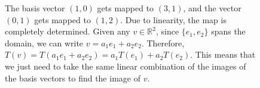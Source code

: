 \begin{example}
\begin{figure}[H]
			\caption{The basis vector $(1, 0)$ gets mapped to $(3, 1)$, and the vector $(0, 1)$ gets mapped to $(1, 2)$. Due to linearity, the map is completely determined. Given any $v \in \mathbb{R}^2$, since $\{e_1, e_2\}$ spans the domain, we can write $v = a_1 e_1 + a_2 e_2$. Therefore, $T(v) = T(a_1 e_1 + a_2 e_2) = a_1 T(e_1) + a_2 T(e_2)$. This means that we just need to take the same linear combination of the images of the basis vectors to find the image of $v$.} 
			\label{fig:linear_map_visual}
		\end{figure}
	\end{example}


